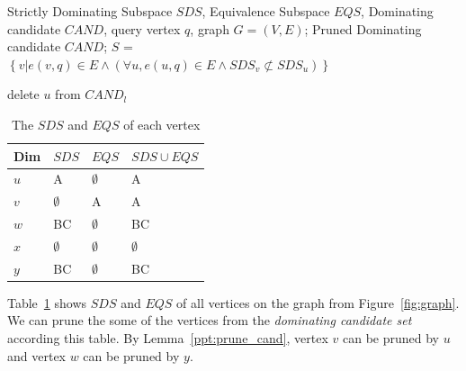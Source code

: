 \begin{algorithm}[H]
  \caption{1-hop Pruning}
  \label{algo:pruning_graph}
  \begin{algorithmic}[1]
  \show\LOOP
    \REQUIRE Strictly Dominating Subspace $\mathit{SDS}$, Equivalence Subspace $\mathit{EQS}$, Dominating candidate $\mathit{CAND}$, query vertex $q$, graph $G=(V, E)$;
    \ENSURE Pruned Dominating candidate $\mathit{CAND}$;
    \STATE $S$ = $\left\{v|e(v, q) \in E \wedge (\forall u, e(u, q) \in E \wedge SDS_v \not\subset SDS_u)\right\}$
    
                    \STATE delete $u$ from $\mathit{CAND}_l$
                \ENDIF
                
            \ENDFOR
        \ENDFOR
    \ENDFOR
  \end{algorithmic}
\end{algorithm}

\begin{table}[h]
    \centering
    \begin{tabular}{|l|l|l|l|}
    \hline
    Dim & $SDS$       & $EQS$       & $SDS \cup EQS$ \\ \hline
    $u$ & A           & $\emptyset$ & A              \\ \hline
    $v$ & $\emptyset$ & A           & A              \\ \hline
    $w$ & BC          & $\emptyset$ & BC             \\ \hline
    $x$ & $\emptyset$ & $\emptyset$ & $\emptyset$    \\ \hline
    $y$ & BC          & $\emptyset$ & BC             \\ \hline
    \end{tabular}
    \caption{The $SDS$ and $EQS$ of each vertex}
    \label{tab:SDS_EQS}
\end{table}

Table~\ref{tab:SDS_EQS} shows $SDS$ and $EQS$ of all vertices on the graph from Figure~\ref{fig:graph}. We can prune the some of the vertices from the \emph{dominating candidate set} according this table. By Lemma~\ref{ppt:prune_cand}, vertex $v$ can be pruned by $u$ and vertex $w$ can be pruned by $y$.

